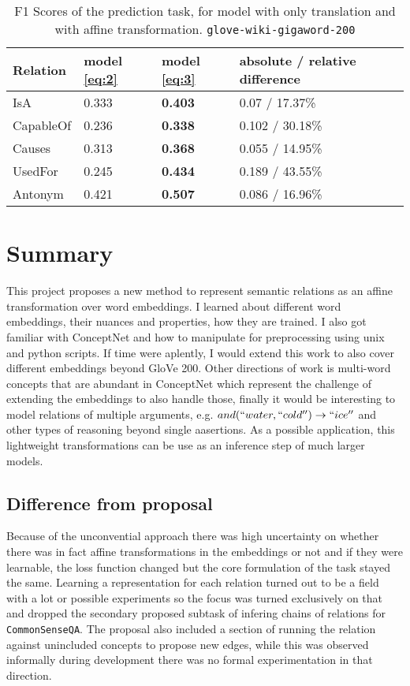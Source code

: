\begin{table}
    \center
	\caption{
    F1 Scores of the prediction task, for model with only translation and with affine transformation.
    \texttt{glove-wiki-gigaword-200}
    }
    \label{evals}
    \begin{tabular}{|l|l|l|l|l|}
        \hline
        Relation & model \eqref{eq:2} & model \eqref{eq:3} & absolute / relative difference \\ \hline
        IsA & 0.333 & \textbf{0.403} & 0.07 / 17.37\%
        \\ \hline
        CapableOf & 0.236 & \textbf{0.338} & 0.102 / 30.18\%
        \\ \hline
        Causes & 0.313 & \textbf{0.368} & 0.055 / 14.95\%
        \\ \hline
        UsedFor & 0.245 & \textbf{0.434} & 0.189 / 43.55\%
        \\ \hline
        Antonym & 0.421 & \textbf{0.507} & 0.086 / 16.96\%
        \\ \hline
        \end{tabular}
\end{table}

\section{Summary}
This project proposes a new method to represent semantic relations as an affine transformation
over word embeddings.
I learned about different word embeddings, their nuances and properties, how they are trained.
I also got familiar with ConceptNet and how to manipulate for preprocessing using unix and python
scripts.
If time were aplently, I would extend this work to also cover different embeddings beyond
GloVe 200. Other directions of work is multi-word concepts that are abundant in ConceptNet
which represent the challenge of extending the embeddings to also handle those,
finally it would be interesting to model relations of multiple arguments,
e.g. $and(``water, ``cold'') \to ``ice''$ and other types of reasoning beyond single aasertions.
As a possible application, this lightweight transformations can be use as an inference step
of much larger models.

\subsection{Difference from proposal}

Because of the unconvential approach there was high uncertainty on whether there
was in fact affine transformations in the embeddings or not and if they were learnable,
the loss function changed but the core formulation of the task stayed the same.
Learning a representation for each relation turned out to be a field with a lot or
possible experiments so the focus was turned exclusively on that and dropped the secondary
proposed subtask of infering chains of relations for \texttt{CommonSenseQA}.
The proposal also included a section of running the relation against
unincluded concepts to propose new edges, while this was observed informally during development
there was no formal experimentation in that direction.


